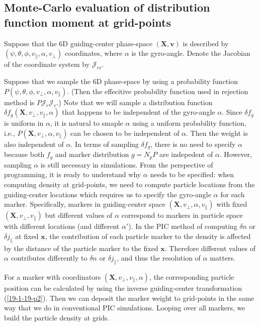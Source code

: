 \documentclass{llncs}
\begin{document}
\subsection{Monte-Carlo evaluation of distribution function moment at
grid-points}

Suppose that the 6D guiding-center phase-space $(\mathbf{X}, \mathbf{v})$ is
described by $(\psi, \theta, \phi, v_{\parallel}, \alpha, v_{\perp})$
coordinates, where $\alpha$ is the gyro-angle. Denote the Jacobian of the
coordinate system by $\mathcal{J}_{r v} \mathcal{}$.

Suppose that we sample the 6D phase-space by using a probability function $P
(\psi, \theta, \phi, v_{\perp}, \alpha, v_{\parallel})$. (Then the effecitive
probability function used in rejection method is $P \mathcal{J}_r
\mathcal{J}_v$.) Note that we will sample a distribution function $\delta f_g
(\mathbf{X}, v_{\perp}, v_{\parallel}, \alpha)$ that happens to be independent
of the gyro-angle $\alpha$. Since $\delta f_g$ is uniform in $\alpha$, it is
natural to smaple $\alpha$ using a uniform probability function, i.e., $P
(\mathbf{X}, v_{\perp}, \alpha, v_{\parallel})$ can be chosen to be
independent of $\alpha$. Then the weight is also independent of $\alpha$. In
terms of sampling $\delta f_g$, there is no need to specify $\alpha$ because
both $f_g$ and marker distribution $g = N_p P$ are indepedent of $\alpha$.
However, sampling $\alpha$ is still necessary in simulations. From the
perspective of programming, it is ready to understand why $\alpha$ needs to be
specified: when computing density at grid-points, we need to compute particle
locations from the guiding-center locations which requires us to specify the
gyro-angle $\alpha$ for each marker. Specifically, markers in guiding-center
space $(\mathbf{X}, v_{\perp}, \alpha, v_{\parallel})$ with fixed
$(\mathbf{X}, v_{\perp}, v_{\parallel})$ but different values of $\alpha$
correspond to markers in particle space with different locations (and
different $\alpha'$). In the PIC method of computing $\delta n$ or $\delta
j_{\parallel}$ at fixed $\mathbf{x}$, the contribution of each particle marker
to the density is affected by the distance of the particle marker to the fixed
$\mathbf{x}$. Therefore different values of $\alpha$ contributes differently
to $\delta n$ or $\delta j_{\parallel}$, and thus the resolution of $\alpha$
matters.

For a marker with coordinators $(\mathbf{X}, v_{\perp}, v_{\parallel},
\alpha)$, the corresponding particle position can be calculated by using the
inverse guiding-center transformation (\ref{19-1-19-p2}). Then we can deposit
the marker weight to grid-points in the same way that we do in conventional
PIC simulations. Looping over all markers, we build the particle density at
grids.
\end{document}
